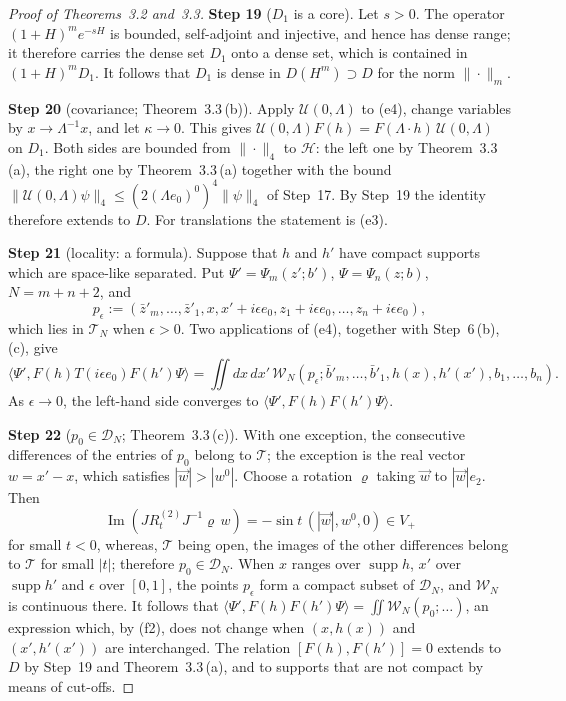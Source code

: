 \documentclass[11pt]{amsart}
\theoremstyle{definition}
\begin{document}
\begin{proof}[Proof of Theorems~3.2 and~3.3]
\textbf{Step 19} ($D_1$ is a core).
Let $s>0$.
The operator $(1+H)^me^{-sH}$ is bounded, self-adjoint and injective, and hence has dense range; it therefore carries the dense set $D_1$ onto a dense set, which is contained in $(1+H)^mD_1$.
It follows that $D_1$ is dense in $D(H^m)\supset D$ for the norm $\|\cdot\|_m$.

\textbf{Step 20} (covariance; Theorem~3.3\,(b)).
Apply $\mathcal U(0,\Lambda)$ to (e4), change variables by $x\to\Lambda^{-1}x$, and let $\kappa\to0$.
This gives $\mathcal U(0,\allowbreak \Lambda)F(h)=\allowbreak F(\Lambda\cdot h)\,\allowbreak \mathcal U(0,\allowbreak \Lambda)$ on $D_1$.
Both sides are bounded from $\|\cdot\|_4$ to $\mathcal H$: the left one by Theorem~3.3\,(a), the right one by Theorem~3.3\,(a) together with the bound $\|\mathcal U(0,\Lambda)\psi\|_4\le(2(\Lambda e_0)^0)^4\|\psi\|_4$ of Step~17.
By Step~19 the identity therefore extends to $D$.
For translations the statement is (e3).

\textbf{Step 21} (locality: a formula).
Suppose that $h$ and $h'$ have compact supports which are space-like separated.
Put $\Psi'=\Psi_m(z';b')$, $\Psi=\Psi_n(z;b)$, $N=m+n+2$, and
\begin{equation*}
p_\epsilon:=(\bar z'_m,\dots,\bar z'_1,x,x'+i\epsilon e_0,z_1+i\epsilon e_0,\dots,z_n+i\epsilon e_0),
\end{equation*}
which lies in $\mathcal T_N$ when $\epsilon>0$.
Two applications of (e4), together with Step~6\,(b), (c), give
\begin{equation*}
\langle\Psi',F(h)T(i\epsilon e_0)F(h')\Psi\rangle=\iint dx\,dx'\,\mathcal W_N(p_\epsilon;\bar b'_m,\dots,\bar b'_1,h(x),h'(x'),b_1,\dots,b_n).
\end{equation*}
As $\epsilon\to0$, the left-hand side converges to $\langle\Psi',F(h)F(h')\Psi\rangle$.

\textbf{Step 22} ($p_0\in\mathcal D_N$; Theorem~3.3\,(c)).
With one exception, the consecutive differences of the entries of $p_0$ belong to $\mathcal T$; the exception is the real vector $w=x'-x$, which satisfies $|\vec w|>|w^0|$.
Choose a rotation $\varrho$ taking $\vec w$ to $|\vec w|e_2$.
Then
\begin{equation*}
\operatorname{Im}(JR^{(2)}_tJ^{-1}\varrho\,w)=-\sin t\,(|\vec w|,w^0,0)\in V_+
\end{equation*}
for small $t<0$, whereas, $\mathcal T$ being open, the images of the other differences belong to $\mathcal T$ for small $|t|$; therefore $p_0\in\mathcal D_N$.
When $x$ ranges over $\operatorname{supp}h$, $x'$ over $\operatorname{supp}h'$ and $\epsilon$ over $[0,1]$, the points $p_\epsilon$ form a compact subset of $\mathcal D_N$, and $\mathcal W_N$ is continuous there.
It follows that $\langle\Psi',F(h)F(h')\Psi\rangle=\iint\mathcal W_N(p_0;\dots)$, an expression which, by (f2), does not change when $(x,h(x))$ and $(x',h'(x'))$ are interchanged.
The relation $[F(h),F(h')]=0$ extends to $D$ by Step~19 and Theorem~3.3\,(a), and to supports that are not compact by means of cut-offs.


\end{proof}
\end{document}
